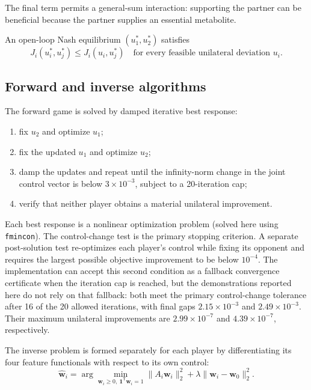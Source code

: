 \documentclass[11pt,a4paper]{article}
\newcommand{\vect}[1]{\boldsymbol{#1}}
\begin{document}
The final term permits a general-sum interaction: supporting the partner can
be beneficial because the partner supplies an essential metabolite.

An open-loop Nash equilibrium
\((u_1^{*},u_2^{*})\) satisfies
\begin{equation}
  J_i(u_i^{*},u_j^{*})
  \le
  J_i(u_i,u_j^{*})
  \quad
  \text{for every feasible unilateral deviation }u_i.
\end{equation}

\subsection{Forward and inverse algorithms}

The forward game is solved by damped iterative best response:
\begin{enumerate}
  \item fix \(u_2\) and optimize \(u_1\);
  \item fix the updated \(u_1\) and optimize \(u_2\);
  \item damp the updates and repeat until the infinity-norm change in the
        joint control vector is below \(3\times10^{-3}\), subject to a
        20-iteration cap;
  \item verify that neither player obtains a material unilateral improvement.
\end{enumerate}
Each best response is a nonlinear optimization problem (solved here using \texttt{fmincon}). The control-change test is
the primary stopping criterion. A separate post-solution test re-optimizes
each player's control while fixing its opponent and requires the largest
possible objective improvement to be below \(10^{-4}\). The implementation
can accept this second condition as a fallback convergence certificate when
the iteration cap is reached, but the demonstrations reported here do not
rely on that fallback: both meet the primary control-change tolerance after
16 of the 20 allowed iterations, with final gaps \(2.15\times10^{-3}\) and
\(2.49\times10^{-3}\). Their maximum unilateral improvements are
\(2.99\times10^{-7}\) and \(4.39\times10^{-7}\), respectively.

The inverse problem is formed separately for each player by differentiating
its four feature functionals with respect to its own control:
\begin{equation}
  \hat{\vect{w}}_i =
  \arg\min_{\vect{w}_i\ge0,\
             \vect{1}^{\mathsf T}\vect{w}_i=1}
  \|A_i\vect{w}_i\|_2^2
  +\lambda\|\vect{w}_i-\vect{w}_0\|_2^2.
\end{equation}
\end{document}

